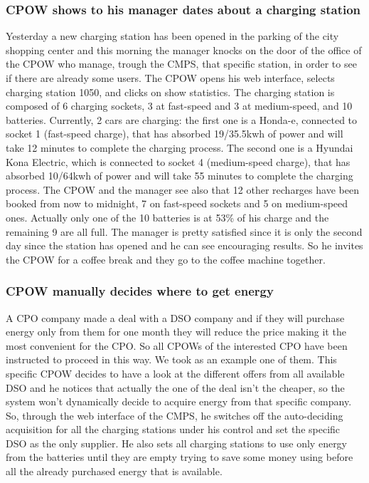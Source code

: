 \documentclass[a4paper]{report}
\begin{document}
\subsubsection{CPOW shows to his manager dates about a charging station}
Yesterday a new charging station has been opened in the parking of the city shopping center and this morning the manager knocks on the door of the office of the CPOW who manage, trough the CMPS, that specific station, in order to see if there are already some users. The CPOW opens his web interface, selects charging station 1050, and clicks on show statistics. The charging station is composed of 6 charging sockets, 3 at fast-speed and 3 at medium-speed, and 10 batteries. Currently, 2 cars are charging: the first one is a Honda-e, connected to socket 1 (fast-speed charge), that has absorbed 19/35.5kwh of power and will take 12 minutes to complete the charging process. The second one is a Hyundai	Kona Electric, which is connected to socket 4 (medium-speed charge), that has absorbed 10/64kwh of power and will take 55 minutes to complete the charging process. The CPOW and the manager see also that 12 other recharges have been booked from now to midnight, 7 on fast-speed sockets and 5 on medium-speed ones. Actually only one of the 10 batteries is at 53\% of his charge and the remaining 9 are all full. The manager is pretty satisfied since it is only the second day since the station has opened and he can see encouraging results. So he invites the CPOW for a coffee break and they go to the coffee machine together.

\subsubsection{CPOW manually decides where to get energy}
A CPO company made a deal with a DSO company and if they will purchase energy only from them for one month they will reduce the price making it the most convenient for the CPO. So all CPOWs of the interested CPO have been instructed to proceed in this way. We took as an example one of them. This specific CPOW decides to have a look at the different offers from all available DSO and he notices that actually the one of the deal isn't the cheaper, so the system won't dynamically decide to acquire energy from that specific company. So, through the web interface of the CMPS, he switches off the auto-deciding acquisition for all the charging stations under his control and set the specific DSO as the only supplier. He also sets all charging stations to use only energy from the batteries until they are empty trying to save some money using before all the already purchased energy that is available. 
\end{document}
